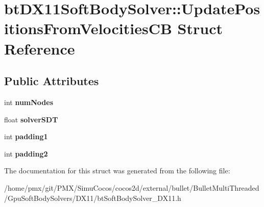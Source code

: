 \hypertarget{structbtDX11SoftBodySolver_1_1UpdatePositionsFromVelocitiesCB}{}\section{bt\+D\+X11\+Soft\+Body\+Solver\+:\+:Update\+Positions\+From\+Velocities\+CB Struct Reference}
\label{structbtDX11SoftBodySolver_1_1UpdatePositionsFromVelocitiesCB}
\subsection*{Public Attributes}
\begin{DoxyCompactItemize}
\item 
\mbox{\label{structbtDX11SoftBodySolver_1_1UpdatePositionsFromVelocitiesCB_a8fdb9645f7e92a1b8386833252aca18b}} 
int {\bfseries num\+Nodes}
\item 
\mbox{\label{structbtDX11SoftBodySolver_1_1UpdatePositionsFromVelocitiesCB_a7a26bce1c481d5160fcfe4960fb61974}} 
float {\bfseries solver\+S\+DT}
\item 
\mbox{\label{structbtDX11SoftBodySolver_1_1UpdatePositionsFromVelocitiesCB_ad3e15989fca0799e3e8a76be7e1dc6f2}} 
int {\bfseries padding1}
\item 
\mbox{\label{structbtDX11SoftBodySolver_1_1UpdatePositionsFromVelocitiesCB_a58d72ff980886df5242e6f9aff2a0998}} 
int {\bfseries padding2}
\end{DoxyCompactItemize}


The documentation for this struct was generated from the following file\+:\begin{DoxyCompactItemize}
\item 
/home/pmx/git/\+P\+M\+X/\+Simu\+Cocos/cocos2d/external/bullet/\+Bullet\+Multi\+Threaded/\+Gpu\+Soft\+Body\+Solvers/\+D\+X11/bt\+Soft\+Body\+Solver\+\_\+\+D\+X11.\+h\end{DoxyCompactItemize}
